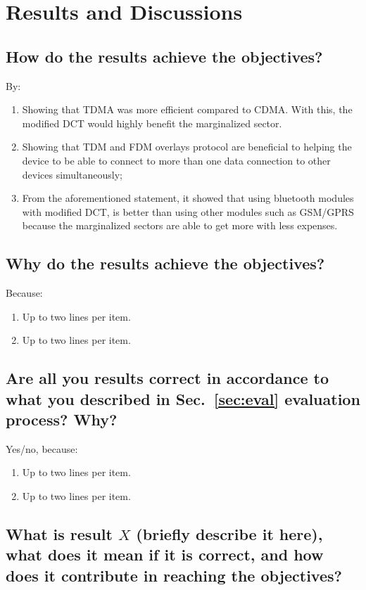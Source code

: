 \section{Results and Discussions}

\subsection{How do the results achieve the objectives?}
By:
\begin{enumerate}
	\item Showing that TDMA was more efficient compared to CDMA. With this, the modified DCT would highly benefit the marginalized sector.
	\item Showing that TDM and FDM overlays protocol are beneficial to helping the device to be able to connect to more than one data connection to other devices simultaneously;
	\item From the aforementioned statement, it showed that using bluetooth modules with modified DCT, is better than using other modules such as GSM/GPRS because the marginalized sectors are able to get more with less expenses.
	
\end{enumerate}

\subsection{Why do the results achieve the objectives?}
Because:
\begin{enumerate}
	\item Up to two lines per item.
	\item Up to two lines per item.
\end{enumerate}

\subsection{Are all you results correct  in accordance to what you described in Sec.~\ref{sec:eval} evaluation process? Why?} 
Yes/no, because:
\begin{enumerate}
	\item Up to two lines per item.
	\item Up to two lines per item.
\end{enumerate}

\subsection{What is result $X$ (briefly describe it here), what does it mean if it is correct, and how does it contribute in reaching the objectives?}
\label{sec:resn}

